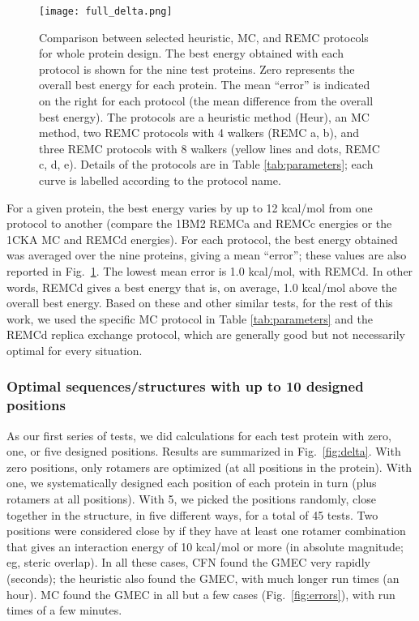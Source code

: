     \begin{figure}[!htbp]
      \centering
        \texttt{[image: full\_delta.png]} 
      \caption{
Comparison between selected heuristic, MC, and REMC protocols for whole protein design. The best energy obtained with each protocol is shown for the nine test proteins. Zero represents the overall best energy for each protein. The mean ``error'' is indicated on the right for each protocol (the mean difference from the overall best energy). The protocols are a heuristic method (Heur), an MC method, two REMC protocols with 4 walkers (REMC a, b), and three REMC protocols with 8 walkers (yellow lines and dots, REMC c, d, e). Details of the protocols are in Table \ref{tab:parameters}; each curve is labelled according to the protocol name.
}
       \label{fig:protocols}
    \end{figure}

For a given protein, the best energy varies by up to 12 kcal/mol from one protocol to another (compare the 1BM2 REMCa and REMCc energies or the 1CKA MC and REMCd energies). For each protocol, the best energy obtained was averaged over the nine proteins, giving a mean ``error''; these values are also reported in Fig.\ \ref{fig:protocols}. The lowest mean error is 1.0 kcal/mol, with REMCd. In other words, REMCd gives a best energy that is, on average, 1.0 kcal/mol above the overall best energy. Based on these and other similar tests, for the rest of this work, we used the specific MC protocol in Table \ref{tab:parameters} and the REMCd replica exchange protocol, which are generally good but not necessarily optimal for every situation. 

\subsubsection{Optimal sequences/structures with up to 10 designed positions}
As our first series of tests, we did calculations for each test protein with zero, one, or five designed positions. Results are summarized in Fig.\ \ref{fig:delta}. With zero positions, only rotamers are optimized (at all positions in the protein). With one, we systematically designed each position of each protein in turn (plus rotamers at all positions). With 5, we picked the positions randomly, close together in the structure, in five different ways, for a total of 45 tests. Two positions were considered close by if they have at least one rotamer combination that gives an interaction energy of 10 kcal/mol or more (in absolute magnitude; eg, steric overlap). In all these cases, CFN found the GMEC very rapidly (seconds); the heuristic also found the GMEC, with much longer run times (an hour). MC found the GMEC in all but a few cases (Fig.\ \ref{fig:errors}), with run times of a few minutes. 


